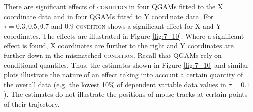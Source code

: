 There are significant effects of \textsc{condition} in four QGAMs fitted to the X coordinate data and in four QGAMs fitted to Y coordinate data. For $\tau=0.3,0.5,0.7$ and $0.9$ \textsc{condition} shows a significant effect for X and Y coordinates. The effects are illustrated in Figure \ref{fig:7_10}. Where a significant effect is found, X coordinates are further to the right and Y coordinates are further down in the mismatched \textsc{condition}. Recall that QGAMs rely on conditional quantiles. Thus, the estimates shown in Figure \ref{fig:7_10} and similar plots illustrate the nature of an effect taking into account a certain quantity of the overall data (e.g. the lowest 10\% of dependent variable data values in $\tau=0.1$). The estimates do not illustrate the positions of mouse-tracks at certain points of their trajectory.

